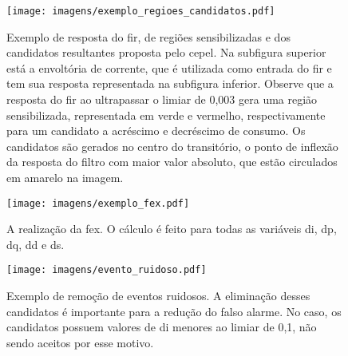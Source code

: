\FloatBarrier

\begin{figure*}[p!]
  \begin{center}
    \begin{subfigure}[c]{\textwidth}
      \texttt{[image: imagens/exemplo\_regioes\_candidatos.pdf]}
      \caption{Exemplo de resposta do \acs{fir}, de regiões sensibilizadas e dos candidatos
resultantes proposta pelo \acs{cepel}. Na subfigura superior está a
envoltória de corrente, que é utilizada como entrada do \acs{fir} e
tem sua resposta representada na subfigura inferior. Observe que a
resposta do \acs{fir} ao ultrapassar o limiar de 0,003 gera uma região
sensibilizada, representada em verde e vermelho, respectivamente para
um candidato a acréscimo e decréscimo de consumo. Os candidatos são
gerados no centro do transitório, o ponto de inflexão da resposta do
filtro com maior valor absoluto, que estão circulados em amarelo na
imagem.}
      \label{fig:resp_fir}
    \end{subfigure}
    \hfill
    \begin{subfigure}[c]{\textwidth}
      \texttt{[image: imagens/exemplo\_fex.pdf]}
      \caption{A realização da \acs{fex}. O cálculo é feito para todas as
variáveis \acs{di}, \acs{dp}, \acs{dq}, \acs{dd} e \acs{ds}.}
      \label{fig:cepel_fex}
    \end{subfigure}
    \hfill
  \end{center}
\end{figure*}

\begin{figure*}[p!]
  \begin{center}
    \ContinuedFloat
    \begin{subfigure}[c]{\textwidth}
      \texttt{[image: imagens/evento\_ruidoso.pdf]}
      \caption{Exemplo de remoção de eventos ruidosos. A eliminação
desses candidatos é importante para a redução do falso alarme. No
caso, os candidatos possuem valores de \acs{di} menores ao limiar de
0,1, não sendo aceitos por esse motivo.}
      \label{fig:ex_ruidoso}
    \end{subfigure}
  \end{center}
\caption[Gráficos descrevendo a operação da metodologia proposta pelo
\acs{cepel}.]{Gráficos descrevendo a operação da metodologia proposta
pelo \acs{cepel}. Os gráficos foram gerados utilizando o ambiente de
análise implementado por este trabalho descrito no
Capítulo~\ref{chap:framework}.}
\label{fig:cepel_metodologia_operacao}
\end{figure*}

